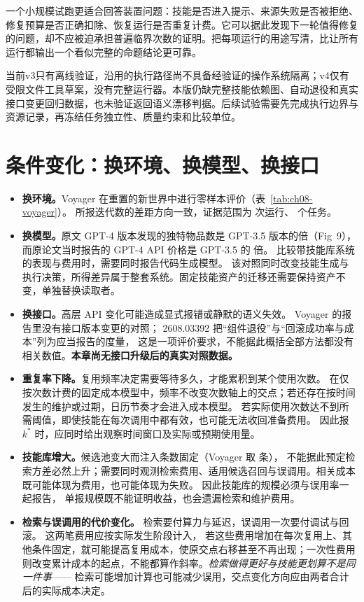 一个小规模试跑更适合回答装置问题：技能是否进入提示、来源失败是否被拒绝、修复预算是否正确扣除、恢复运行是否重复计费。它可以据此发现下一轮值得修复的问题，却不应被迫承担普遍临界次数的证明。把每项运行的用途写清，比让所有运行都输出一个看似完整的命题结论更可靠。

当前v3只有离线验证，沿用的执行路径尚不具备经验证的操作系统隔离；v4仅有受限文件工具草案，没有完整运行器。本版仍缺完整技能依赖图、自动退役和真实接口变更回归数据，也未验证返回语义漂移判据。后续试验需要先完成执行边界与资源记录，再冻结任务独立性、质量约束和比较单位。

\section{条件变化：换环境、换模型、换接口}
\label{sec:ch08-conditions}

\begin{itemize}
  \item \textbf{换环境。}Voyager 在重置的新世界中进行零样本评价（表~\ref{tab:ch08-voyager}）。
        所报迭代数的差距方向一致，证据范围为  次运行、 个任务。
  \item \textbf{换模型。}原文 GPT-4 版本发现的独特物品数是 GPT-3.5 版本的倍（Fig~9），
        而原论文当时报告的 GPT-4 API 价格是 GPT-3.5 的  倍\cite{voyager-2305}。
        比较带技能库系统的表现与费用时，需要同时报告代码生成模型。
        该对照同时改变技能生成与执行决策，所得差异属于整套系统。固定技能资产的迁移还需要保持资产不变，单独替换读取者。
  \item \textbf{换接口。}高层 API 变化可能造成显式报错或静默的语义失效。
        Voyager 的报告里没有接口版本变更的对照\cite{voyager-2305}；
        2608.03392 把``组件退役''与``回滚成功率与成本''列为应当报告的度量\cite{coding-survey-2608}，
        这是一项评价要求，不能据此概括全部方法都没有相关数值。\textbf{本章尚无接口升级后的真实对照数据。}
  \item \textbf{重复率下降。}复用频率决定需要等待多久，才能累积到某个使用次数。
        在仅按次数计费的固定成本模型中，频率不改变次数轴上的交点；若还存在按时间发生的维护或过期，日历节奏才会进入成本模型。
        若实际使用次数达不到所需阈值，即使技能在每次调用中都有效，也可能无法收回准备费用。
        因此报 $k^{*}$ 时，应同时给出观察时间窗口及实际或预期使用量。
  \item \textbf{技能库增大。}候选池变大而注入条数固定（Voyager 取  条），
        不能据此预定检索方差必然上升；需要同时观测检索费用、适用候选召回与误调用。相关成本既可能体现为费用，也可能体现为失败。
        因此技能库的规模必须与误用率一起报告，
        单报规模既不能证明收益，也会遗漏检索和维护费用。
  \item \textbf{检索与误调用的代价变化。}        检索要付算力与延迟，误调用一次要付调试与回滚。
        这两笔费用应按实际发生阶段计入，
        若这些费用增加在每次复用上、其他条件固定，就可能提高复用成本，使原交点右移甚至不再出现；一次性费用则改变累计成本的起点，不能都算作斜率。\emph{检索做得更好与技能更划算不是同一件事}——
        检索可能增加计算也可能减少误用，交点变化方向应由两者合计后的实际成本决定。
\end{itemize}

